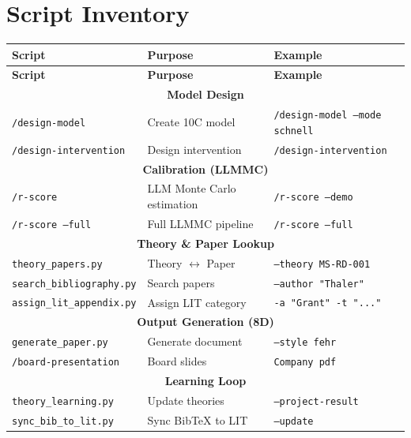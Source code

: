 \section{Script Inventory}
\label{sec:dp-scripts}

\begin{tcolorbox}[colback=green!3!white, colframe=green!60!black,
    title=\textbf{Complete Script Reference}]

\small
\begin{longtable}{|l|l|l|}
\hline
\textbf{Script} & \textbf{Purpose} & \textbf{Example} \\
\hline
\hline
\endfirsthead
\hline
\textbf{Script} & \textbf{Purpose} & \textbf{Example} \\
\hline
\endhead
\multicolumn{3}{|c|}{\textbf{Model Design}} \\
\hline
\texttt{/design-model} & Create 10C model & \texttt{/design-model --mode schnell} \\
\texttt{/design-intervention} & Design intervention & \texttt{/design-intervention} \\
\hline
\multicolumn{3}{|c|}{\textbf{Calibration (LLMMC)}} \\
\hline
\texttt{/r-score} & LLM Monte Carlo estimation & \texttt{/r-score --demo} \\
\texttt{/r-score --full} & Full LLMMC pipeline & \texttt{/r-score --full} \\
\hline
\multicolumn{3}{|c|}{\textbf{Theory \& Paper Lookup}} \\
\hline
\texttt{theory\_papers.py} & Theory $\leftrightarrow$ Paper & \texttt{--theory MS-RD-001} \\
\texttt{search\_bibliography.py} & Search papers & \texttt{--author "Thaler"} \\
\texttt{assign\_lit\_appendix.py} & Assign LIT category & \texttt{-a "Grant" -t "..."} \\
\hline
\multicolumn{3}{|c|}{\textbf{Output Generation (8D)}} \\
\hline
\texttt{generate\_paper.py} & Generate document & \texttt{--style fehr} \\
\texttt{/board-presentation} & Board slides & \texttt{Company pdf} \\
\hline
\multicolumn{3}{|c|}{\textbf{Learning Loop}} \\
\hline
\texttt{theory\_learning.py} & Update theories & \texttt{--project-result} \\
\texttt{sync\_bib\_to\_lit.py} & Sync BibTeX to LIT & \texttt{--update} \\

\end{longtable}
\end{tcolorbox}
